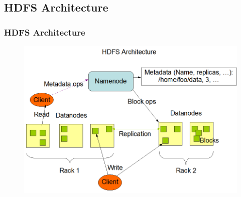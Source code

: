 \documentclass{beamer}
\begin{document}
\subsection{HDFS Architecture}
\begin{frame}
	\frametitle{HDFS Architecture}
	\begin{figure}[h]
		\centering
		\includegraphics[width=\linewidth]{figs/hdfsarchitecturev1.png}
	\end{figure}
\end{frame}
\end{document}
